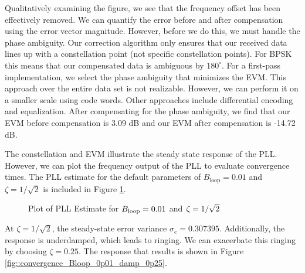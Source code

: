 \documentclass{article}
\begin{document}
\noindent Qualitatively examining the figure, we see that the frequency offset has been effectively removed. We can quantify the error before and after compensation using the error vector magnitude. However, before we do this, we must handle the phase ambiguity. Our correction algorithm only ensures that our received data lines up with a constellation point (not specific constellation points). For BPSK this means that our compensated data is ambiguous by $180^{\circ}$. For a first-pass implementation, we select the phase ambiguity that minimizes the EVM. This approach over the entire data set is not realizable. However, we can perform it on a smaller scale using code words. Other approaches include differential encoding and equalization. After compensating for the phase ambiguity, we find that our EVM before compensation is 3.09 dB and our EVM after compensation is -14.72 dB.

  The constellation and EVM illustrate the steady state response of the PLL. However, we can plot the frequency output of the PLL to evaluate convergence times. The PLL estimate for the default parameters of $B_\text{loop} = 0.01$ and $\zeta = 1/\sqrt{2}$ is included in Figure \ref{fig::convergence_Bloop_0p01_damp_sqrt_2}.

\begin{figure}[H]
	\centerline{}
	\caption{Plot of PLL Estimate for $\protect{B_\text{loop}} = 0.01$ and $\protect{\zeta = 1/\sqrt{2}}$}
	\label{fig::convergence_Bloop_0p01_damp_sqrt_2}
\end{figure}

\noindent At $\zeta = 1/\sqrt{2}$, the steady-state error variance $\sigma_e=0.307395$. Additionally, the response is underdamped, which leads to ringing. We can exacerbate this ringing by choosing $\zeta=0.25$. The response that results is shown in Figure \ref{fig::convergence_Bloop_0p01_damp_0p25}.
\end{document}
